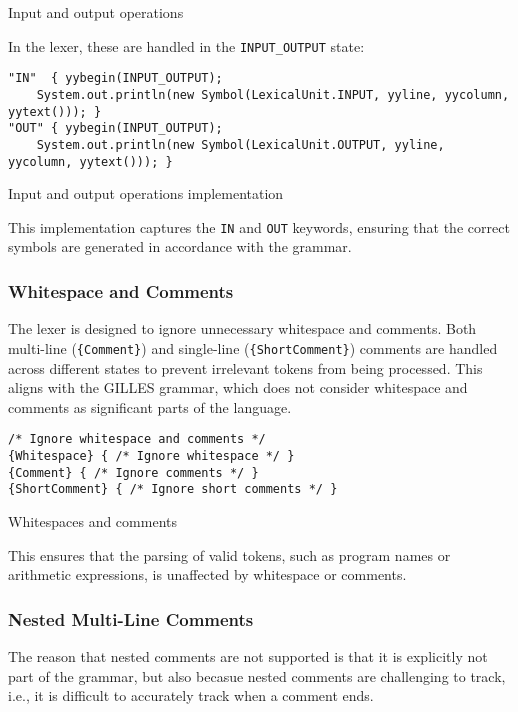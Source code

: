      \begin{table}[h]
		\centering
		\caption{Input and output operations}
	\end{table}

	In the lexer, these are handled in the \texttt{INPUT\_OUTPUT} state:

	\begin{verbatim}
"IN"  { yybegin(INPUT_OUTPUT);
    System.out.println(new Symbol(LexicalUnit.INPUT, yyline, yycolumn, yytext())); }
"OUT" { yybegin(INPUT_OUTPUT);
    System.out.println(new Symbol(LexicalUnit.OUTPUT, yyline, yycolumn, yytext())); }
	\end{verbatim}

    \begin{table}[h]
		\centering
		\caption{Input and output operations implementation}
	\end{table}

	This implementation captures the \texttt{IN} and \texttt{OUT} keywords, ensuring that the correct symbols are generated in accordance with the grammar.


	\subsubsection{Whitespace and Comments}
	The lexer is designed to ignore unnecessary whitespace and comments. Both multi-line (\texttt{\{Comment\}}) and single-line (\texttt{\{ShortComment\}}) comments are handled across different states to prevent irrelevant tokens from being processed. This aligns with the GILLES grammar, which does not consider whitespace and comments as significant parts of the language.

	\begin{verbatim}
/* Ignore whitespace and comments */
{Whitespace} { /* Ignore whitespace */ }
{Comment} { /* Ignore comments */ }
{ShortComment} { /* Ignore short comments */ }
	\end{verbatim}

    \begin{table}[h]
		\centering
		\caption{Whitespaces and comments}
	\end{table}

	This ensures that the parsing of valid tokens, such as program names or arithmetic expressions, is unaffected by whitespace or comments.\\
 \subsubsection{Nested Multi-Line Comments}
	The reason that nested comments are not supported is that it is explicitly not part of the grammar, but also becasue nested comments are challenging to track, i.e., it
	is difficult to accurately track when a comment ends.\\

